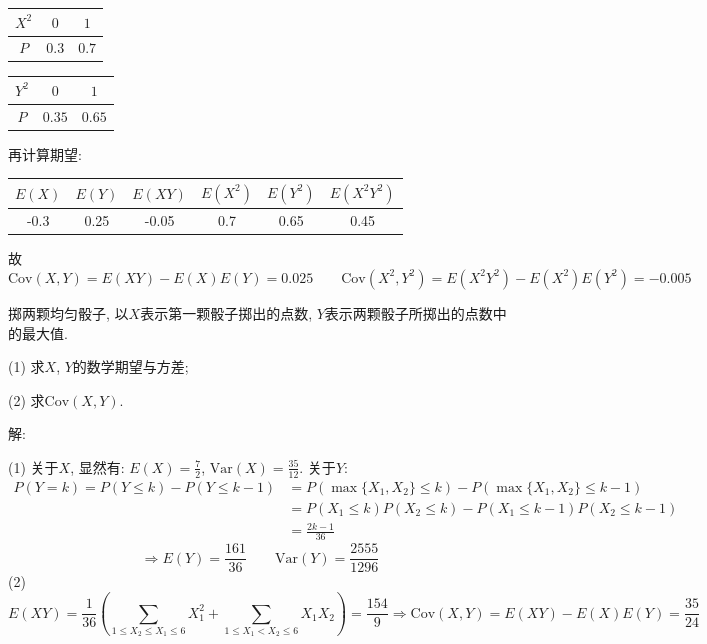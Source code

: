 \documentclass[standard]{ExBook}
\renewenvironment{shaded}{%
  \def\FrameCommand{\fboxsep=\FrameSep \colorbox{shadecolor}}%
  \MakeFramed{\advance\hsize-\width \FrameRestore}%
}{%
  \endMakeFramed
}
\begin{document}
\begin{qitems}
\vspace{0.5em}
\setlength{\tabcolsep}{1.75em}
\begin{minipage}[c]{0.39\textwidth}
\centering
\begin{tabular}{c|cc}
    $X^2$ & $0$ & $1$\\
    \hline
    $P$ & $0.3$ & $0.7$
\end{tabular}
\end{minipage}
\begin{minipage}[c]{0.6\textwidth}
\centering
\begin{tabular}{c|cc}
    $Y^2$ & $0$ & $1$\\
    \hline
    $P$ & $0.35$ & $0.65$
\end{tabular}
\end{minipage}
\vspace{0.2em}

再计算期望:

\vspace{0.5em}
\setlength{\tabcolsep}{1.75em}
\begin{minipage}[c]{1\textwidth}
\centering
\begin{tabular}{c|c|c|c|c|c}
    $E(X)$ & $E(Y)$ & $E(XY)$ & $E(X^2)$ & $E(Y^2)$ & $E(X^2 Y^2)$\\
    \hline
    -0.3 & 0.25 & -0.05 & 0.7 & 0.65 & 0.45
\end{tabular}
\end{minipage}

故
$$\mathrm{Cov}(X,Y)=E(XY)-E(X)E(Y)=0.025 \qquad \mathrm{Cov}(X^2,Y^2)=E(X^2 Y^2)-E(X^2)E(Y^2)=-0.005$$

\vspace{2.5cm-5em}

    \begin{bbox}
    \begin{shaded}
        \qitem
掷两颗均匀骰子, 以$X$表示第一颗骰子掷出的点数, $Y$表示两颗骰子所掷出的点数中的最大值.

(1) 求$X$, $Y$的数学期望与方差;

(2) 求$\mathrm{Cov}(X,Y)$.
    \end{shaded}
    \end{bbox}

\vspace{\dimexpr2.5cm-5em\relax}

解: 

(1) 关于$X$, 显然有: $E(X)=\displaystyle\frac{7}{2}$, $\mathrm{Var}(X)=\displaystyle\frac{35}{12}$. 关于$Y$:
$$
    \begin{array}{ll}
P(Y=k)=P(Y\leq k)-P(Y\leq k-1) & =P(\max\{X_1,X_2\}\leq k)-P(\max\{X_1,X_2\}\leq k-1)\\
 & =P(X_1\leq k)P(X_2\leq k)-P(X_1\leq k-1)P(X_2\leq k-1)\\
 & =\displaystyle\frac{2k-1}{36}
    \end{array}
$$
$$\Longrightarrow E(Y)=\frac{161}{36} \qquad \mathrm{Var}(Y)=\frac{2555}{1296}$$
(2)
$$E(XY)=\displaystyle\frac{1}{36}\left(\sum\limits_{1\leq X_2\leq X_1\leq 6}X_1^2+\sum\limits_{1\leq X_1<X_2\leq 6}X_1 X_2\right)=\frac{154}{9} \Longrightarrow \mathrm{Cov}(X,Y)=E(XY)-E(X)E(Y)=\frac{35}{24}$$


\end{qitems}
\end{document}

